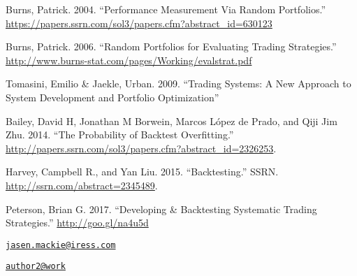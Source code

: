 Burns, Patrick. 2004. ``Performance Measurement Via Random Portfolios.''
\url{https://papers.ssrn.com/sol3/papers.cfm?abstract_id=630123}

Burns, Patrick. 2006. ``Random Portfolios for Evaluating Trading
Strategies.''
\url{http://www.burns-stat.com/pages/Working/evalstrat.pdf}

Tomasini, Emilio \& Jaekle, Urban. 2009. ``Trading Systems: A New
Approach to System Development and Portfolio Optimization''

Bailey, David H, Jonathan M Borwein, Marcos López de Prado, and Qiji Jim
Zhu. 2014. ``The Probability of Backtest Overfitting.''
\url{http://papers.ssrn.com/sol3/papers.cfm?abstract_id=2326253}.

Harvey, Campbell R., and Yan Liu. 2015. ``Backtesting.'' SSRN.
\url{http://ssrn.com/abstract=2345489}.

Peterson, Brian G. 2017. ``Developing \& Backtesting Systematic Trading
Strategies.'' \url{http://goo.gl/na4u5d}




\address{%
Jasen Mackie\\
Affiliation\\
line 1\\ line 2\\
}
\href{mailto:jasen.mackie@iress.com}{\nolinkurl{jasen.mackie@iress.com}}

\address{%
Brian G. Peterson\\
Affiliation\\
line 1\\ line 2\\
}
\href{mailto:author2@work}{\nolinkurl{author2@work}}

